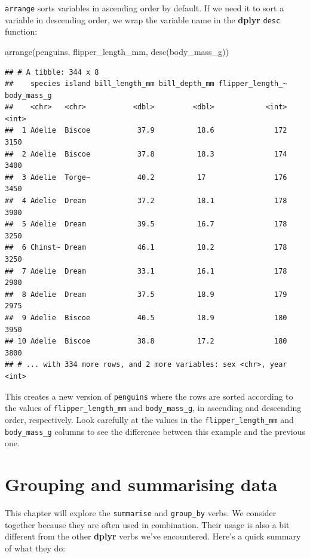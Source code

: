 \documentclass[
]{book}
\newenvironment{Shaded}{\begin{snugshade}}{\end{snugshade}}
\newcommand{\FunctionTok}[1]{\textcolor[rgb]{0.00,0.00,0.00}{#1}}
\newcommand{\NormalTok}[1]{#1}
\begin{document}
\texttt{arrange} sorts variables in ascending order by default. If we need it to sort a variable in descending order, we wrap the variable name in the \textbf{dplyr} \texttt{desc} function:

\begin{Shaded}
\begin{Highlighting}[]
\FunctionTok{arrange}\NormalTok{(penguins, flipper\_length\_mm, }\FunctionTok{desc}\NormalTok{(body\_mass\_g))}
\end{Highlighting}
\end{Shaded}

\begin{verbatim}
## # A tibble: 344 x 8
##    species island bill_length_mm bill_depth_mm flipper_length_~ body_mass_g
##    <chr>   <chr>           <dbl>         <dbl>            <int>       <int>
##  1 Adelie  Biscoe           37.9          18.6              172        3150
##  2 Adelie  Biscoe           37.8          18.3              174        3400
##  3 Adelie  Torge~           40.2          17                176        3450
##  4 Adelie  Dream            37.2          18.1              178        3900
##  5 Adelie  Dream            39.5          16.7              178        3250
##  6 Chinst~ Dream            46.1          18.2              178        3250
##  7 Adelie  Dream            33.1          16.1              178        2900
##  8 Adelie  Dream            37.5          18.9              179        2975
##  9 Adelie  Biscoe           40.5          18.9              180        3950
## 10 Adelie  Biscoe           38.8          17.2              180        3800
## # ... with 334 more rows, and 2 more variables: sex <chr>, year <int>
\end{verbatim}

This creates a new version of \texttt{penguins} where the rows are sorted according to the values of \texttt{flipper\_length\_mm} and \texttt{body\_mass\_g}, in ascending and descending order, respectively. Look carefully at the values in the \texttt{flipper\_length\_mm} and \texttt{body\_mass\_g} columns to see the difference between this example and the previous one.

\hypertarget{grouping-and-summarising-data}{%
\chapter{Grouping and summarising data}\label{grouping-and-summarising-data}}

This chapter will explore the \texttt{summarise} and \texttt{group\_by} verbs. We consider together because they are often used in combination. Their usage is also a bit different from the other \textbf{dplyr} verbs we've encountered. Here's a quick summary of what they do:
\end{document}
